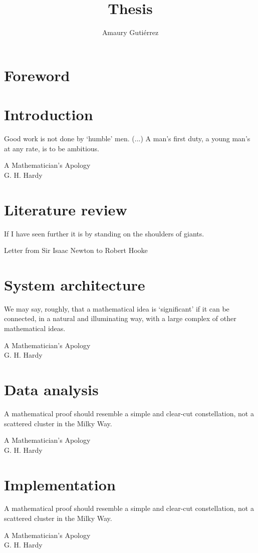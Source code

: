 \documentclass[12pt,letterpaper]{book}
\author{Amaury Guti\'errez}
\title{Thesis}
\theoremstyle{definition} \newtheorem{definition}{Definición}[section]
\theoremstyle{plain} \newtheorem{theorem}{Teorema}[section]
\theoremstyle{plain} \newtheorem{lemma}{Lema}[section]
\theoremstyle{plain} \newtheorem{proposition}[theorem]{Proposici\'on}
\theoremstyle{plain} \newtheorem{corollary}[theorem]{Corolario}
\theoremstyle{plain} \newtheorem{remark}[theorem]{Comentario}
\begin{document}
\frontmatter
 

\frontmatter
\tableofcontents
\chapter{Foreword}


\mainmatter

\chapter{Introduction}
\epigraph{Good work is not done by `humble' men. (...) A man's first duty, a young man's at any rate, is to be ambitious.}{A Mathematician's Apology \\ G. H. Hardy}


\chapter{Literature review}
\epigraph{If I have seen further it is by standing on the shoulders of giants.}{Letter from Sir Isaac Newton to Robert Hooke}


\chapter{System architecture}
\epigraph{We may say, roughly, that a mathematical idea is `significant' if it can be connected, in a natural and illuminating way, with a large complex of other mathematical ideas.}{A Mathematician's Apology \\ G. H. Hardy}


\chapter{Data analysis}
\epigraph{A mathematical proof should resemble a simple and clear-cut constellation, not a scattered cluster in the Milky Way.}{A Mathematician's Apology \\ G. H. Hardy}


\chapter{Implementation}
\epigraph{A mathematical proof should resemble a simple and clear-cut constellation, not a scattered cluster in the Milky Way.}{A Mathematician's Apology \\ G. H. Hardy}

\end{document}
